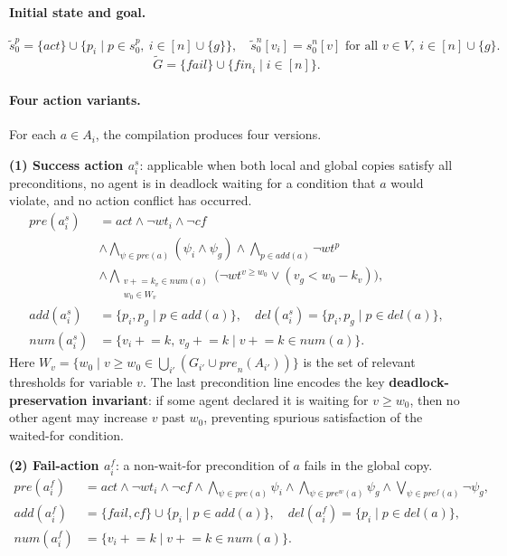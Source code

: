 \documentclass{article}
\theoremstyle{definition}
\newcommand{\pre}{\mathit{pre}}
\newcommand{\pref}{\mathit{pre}^f}
\newcommand{\prew}{\mathit{pre}^w}
\newcommand{\add}{\mathit{add}}
\newcommand{\del}{\mathit{del}}
\newcommand{\num}{\mathit{num}}
\newcommand{\fail}{\mathit{fail}}
\newcommand{\act}{\mathit{act}}
\newcommand{\fin}{\mathit{fin}}
\newcommand{\cf}{\mathit{cf}}
\newcommand{\wt}{\mathit{wt}}
\begin{document}
\paragraph{Initial state and goal.}
\[
  \widetilde{s}_0^p = \{\act\} \cup \{p_i \mid p \in s_0^p,\ i \in [n] \cup \{g\}\}, \quad
  \widetilde{s}_0^n[v_i] = s_0^n[v] \text{ for all } v \in V,\ i \in [n] \cup \{g\}.
\]
\[
  \widetilde{G} = \{\fail\} \cup \{\fin_i \mid i \in [n]\}.
\]

\paragraph{Four action variants.}
For each $a \in A_i$, the compilation produces four versions.

\medskip
\noindent\textbf{(1) Success action $a_i^s$}: applicable when both local and global copies satisfy all preconditions, no agent is in deadlock waiting for a condition that $a$ would violate, and no action conflict has occurred.
\begin{align*}
  \pre(a_i^s) &= \act \wedge \neg \wt_i \wedge \neg \cf \\
    &\wedge \textstyle\bigwedge_{\psi \in \pre(a)} (\psi_i \wedge \psi_g)
     \wedge \textstyle\bigwedge_{p \in \add(a)} \neg \wt^p \\
    &\wedge \textstyle\bigwedge_{\substack{v \mathrel{+}= k_v \in \num(a) \\ w_0 \in W_v}} \!\!
       \bigl(\neg \wt^{v \geq w_0} \vee (v_g < w_0 - k_v)\bigr), \\
  \add(a_i^s) &= \{p_i, p_g \mid p \in \add(a)\}, \quad
  \del(a_i^s) = \{p_i, p_g \mid p \in \del(a)\}, \\
  \num(a_i^s) &= \{v_i \mathrel{+}= k,\, v_g \mathrel{+}= k \mid v \mathrel{+}= k \in \num(a)\}.
\end{align*}
Here $W_v = \{w_0 \mid v \geq w_0 \in \bigcup_{i'} (G_{i'} \cup \mathit{pre}_n(A_{i'}))\}$ is the set of relevant thresholds for variable $v$. The last precondition line encodes the key \textbf{deadlock-preservation invariant}: if some agent declared it is waiting for $v \geq w_0$, then no other agent may increase $v$ past $w_0$, preventing spurious satisfaction of the waited-for condition.

\medskip
\noindent\textbf{(2) Fail-action $a_i^f$}: a non-wait-for precondition of $a$ fails in the global copy.
\begin{align*}
  \pre(a_i^f) &= \act \wedge \neg \wt_i \wedge \neg \cf
    \wedge \textstyle\bigwedge_{\psi \in \pre(a)} \psi_i
    \wedge \textstyle\bigwedge_{\psi \in \prew(a)} \psi_g
    \wedge \textstyle\bigvee_{\psi \in \pref(a)} \neg \psi_g, \\
  \add(a_i^f) &= \{\fail, \cf\} \cup \{p_i \mid p \in \add(a)\}, \quad
  \del(a_i^f) = \{p_i \mid p \in \del(a)\}, \\
  \num(a_i^f) &= \{v_i \mathrel{+}= k \mid v \mathrel{+}= k \in \num(a)\}.
\end{align*}
\end{document}
